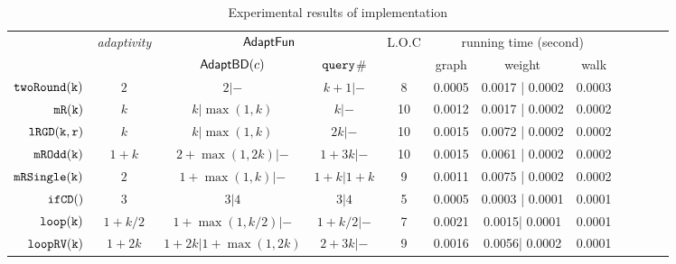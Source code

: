 {\footnotesize
\begin {table}[H]
\vspace{-0.4cm}
    \caption{Experimental results of {\THESYSTEM} implementation}
    \vspace{-0.5cm}
        \label{tb:adapt-imp}
        \begin{center}
        \centering
{\tiny
        \begin{tabular}{| >{\tiny}r | c | c | c | c | c | c | c | c | c | c | c }
         \hline \hline
        \multirow{2}{*}{Program $c$} & 
        \multirow{2}{*}{\emph{adaptivity}}
         & \multicolumn{2}{c|}{$\textsf{AdaptFun}$}
         & {L.O.C}
         & \multicolumn{3}{c|}{running time (second)} \\ 
         \cline{3-8}
         & & {$\mathsf{AdaptBD}(c)$ } & {${\tt query}$\# } &  & graph & weight & walk \\ 
         \cline{6-8}
         \hline \hline
         $  \mathtt{twoRound(k)}$ & $2$ &  $2| -$ & $k+1 | -$  & 8 & 0.0005 & 0.0017 | 0.0002 & 0.0003 \\
         $  \mathtt{mR(k)}$ & $k$ &  $k| \max(1,k)$ & $k| -$  &  10 & 0.0012 & 0.0017 | 0.0002 & 0.0002 \\
         $  \mathtt{lRGD(k, r)}$ & $k$ & $k | \max(1,k) $ & $ 2k | -$  &  10 & 0.0015 & 0.0072 | 0.0002 & 0.0002  \\
         $  \mathtt{mROdd(k)}$ & $1 + k$ &  $2+\max(1,2k) | - $ & $1 + 3 k | - $  &  10 & 0.0015 & 0.0061 | 0.0002 & 0.0002 \\
         $  \mathtt{mRSingle(k)}$    & $2$ &  $1+ \max(1, k) | -$ & $1 + k | 1 + k$  &  9 & 0.0011 & 0.0075 | 0.0002 & 0.0002 \\
         $  \mathtt{ifCD()}$ & $3$ & $3 | 4$ &   $3| 4$  & 5 & 0.0005 & 0.0003 | 0.0001  & 0.0001 \\
         $  \mathtt{loop(k)}$ & $1+k/2$ &   $1 +\max(1, k/2) |- $  &  $1+k/2 | - $ & 7 & 0.0021 & 0.0015| 0.0001 &  0.0001 \\
         $  \mathtt{loopRV(k)}$ & $1 + 2k$ &  $1 + 2k| 1 + \max(1,2k)$ & $2 + 3 k| -$  &  9 & 0.0016 & 0.0056| 0.0002 & 0.0001  \\

\end{tabular}}
\end{center}
\end{table}}
